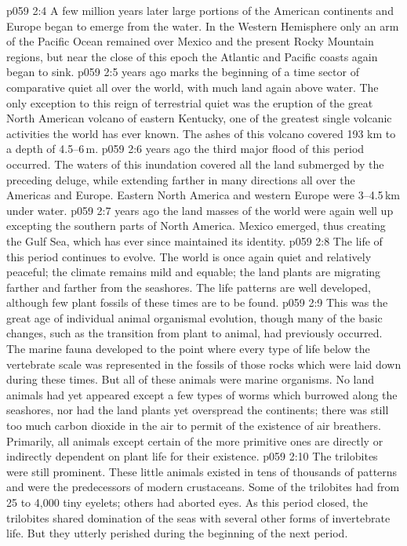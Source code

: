 \vs p059 2:4 A few million years later large portions of the American continents and Europe began to emerge from the water. In the Western Hemisphere only an arm of the Pacific Ocean remained over Mexico and the present Rocky Mountain regions, but near the close of this epoch the Atlantic and Pacific coasts again began to sink.
\vs p059 2:5 \pc {} years ago marks the beginning of a time sector of comparative quiet all over the world, with much land again above water. The only exception to this reign of terrestrial quiet was the eruption of the great North American volcano of eastern Kentucky, one of the greatest single volcanic activities the world has ever known. The ashes of this volcano covered 193 km to a depth of 4.5--6\,m.
\vs p059 2:6 \pc {} years ago the third major flood of this period occurred. The waters of this inundation covered all the land submerged by the preceding deluge, while extending farther in many directions all over the Americas and Europe. Eastern North America and western Europe were 3--4.5\,km under water.
\vs p059 2:7 \pc {} years ago the land masses of the world were again well up excepting the southern parts of North America. Mexico emerged, thus creating the Gulf Sea, which has ever since maintained its identity.
\vs p059 2:8 The life of this period continues to evolve. The world is once again quiet and relatively peaceful; the climate remains mild and equable; the land plants are migrating farther and farther from the seashores. The life patterns are well developed, although few plant fossils of these times are to be found.
\vs p059 2:9 \pc This was the great age of individual animal organismal evolution, though many of the basic changes, such as the transition from plant to animal, had previously occurred. The marine fauna developed to the point where every type of life below the vertebrate scale was represented in the fossils of those rocks which were laid down during these times. But all of these animals were marine organisms. No land animals had yet appeared except a few types of worms which burrowed along the seashores, nor had the land plants yet overspread the continents; there was still too much carbon dioxide in the air to permit of the existence of air breathers. Primarily, all animals except certain of the more primitive ones are directly or indirectly dependent on plant life for their existence.
\vs p059 2:10 The trilobites were still prominent. These little animals existed in tens of thousands of patterns and were the predecessors of modern crustaceans. Some of the trilobites had from 25 to 4,000 tiny eyelets; others had aborted eyes. As this period closed, the trilobites shared domination of the seas with several other forms of invertebrate life. But they utterly perished during the beginning of the next period.
